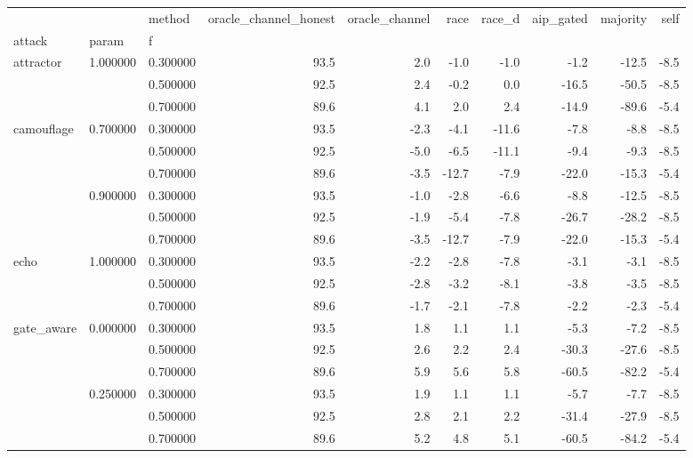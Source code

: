 \begin{tabular}{lllrrrrrrr}
\toprule
 &  & method & oracle\_channel\_honest & oracle\_channel & race & race\_d & aip\_gated & majority & self \\
attack & param & f &  &  &  &  &  &  &  \\
\midrule
\multirow[t]{3}{*}{attractor} & \multirow[t]{3}{*}{1.000000} & 0.300000 & 93.5 & 2.0 & -1.0 & -1.0 & -1.2 & -12.5 & -8.5 \\
 &  & 0.500000 & 92.5 & 2.4 & -0.2 & 0.0 & -16.5 & -50.5 & -8.5 \\
 &  & 0.700000 & 89.6 & 4.1 & 2.0 & 2.4 & -14.9 & -89.6 & -5.4 \\
\cline{1-10} \cline{2-10}
\multirow[t]{6}{*}{camouflage} & \multirow[t]{3}{*}{0.700000} & 0.300000 & 93.5 & -2.3 & -4.1 & -11.6 & -7.8 & -8.8 & -8.5 \\
 &  & 0.500000 & 92.5 & -5.0 & -6.5 & -11.1 & -9.4 & -9.3 & -8.5 \\
 &  & 0.700000 & 89.6 & -3.5 & -12.7 & -7.9 & -22.0 & -15.3 & -5.4 \\
\cline{2-10}
 & \multirow[t]{3}{*}{0.900000} & 0.300000 & 93.5 & -1.0 & -2.8 & -6.6 & -8.8 & -12.5 & -8.5 \\
 &  & 0.500000 & 92.5 & -1.9 & -5.4 & -7.8 & -26.7 & -28.2 & -8.5 \\
 &  & 0.700000 & 89.6 & -3.5 & -12.7 & -7.9 & -22.0 & -15.3 & -5.4 \\
\cline{1-10} \cline{2-10}
\multirow[t]{3}{*}{echo} & \multirow[t]{3}{*}{1.000000} & 0.300000 & 93.5 & -2.2 & -2.8 & -7.8 & -3.1 & -3.1 & -8.5 \\
 &  & 0.500000 & 92.5 & -2.8 & -3.2 & -8.1 & -3.8 & -3.5 & -8.5 \\
 &  & 0.700000 & 89.6 & -1.7 & -2.1 & -7.8 & -2.2 & -2.3 & -5.4 \\
\cline{1-10} \cline{2-10}
\multirow[t]{15}{*}{gate\_aware} & \multirow[t]{3}{*}{0.000000} & 0.300000 & 93.5 & 1.8 & 1.1 & 1.1 & -5.3 & -7.2 & -8.5 \\
 &  & 0.500000 & 92.5 & 2.6 & 2.2 & 2.4 & -30.3 & -27.6 & -8.5 \\
 &  & 0.700000 & 89.6 & 5.9 & 5.6 & 5.8 & -60.5 & -82.2 & -5.4 \\
\cline{2-10}
 & \multirow[t]{3}{*}{0.250000} & 0.300000 & 93.5 & 1.9 & 1.1 & 1.1 & -5.7 & -7.7 & -8.5 \\
 &  & 0.500000 & 92.5 & 2.8 & 2.1 & 2.2 & -31.4 & -27.9 & -8.5 \\
 &  & 0.700000 & 89.6 & 5.2 & 4.8 & 5.1 & -60.5 & -84.2 & -5.4 \\

\end{tabular}
